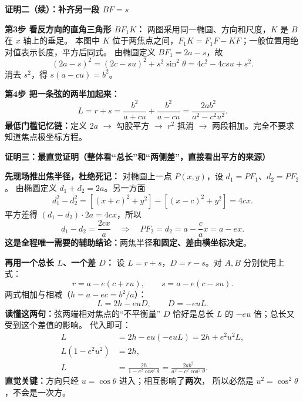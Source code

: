 \clearpage
\begin{proofbox}
\textbf{\textcolor{CProof}{证明二（续）：补齐另一段 $BF=s$}}

\begin{center}\end{center}

\textbf{第3步 看反方向的直角三角形 $BF_1K$：}
两图采用同一椭圆、方向和尺度，$K$ 是 $B$ 在 $x$ 轴上的垂足。
本图中 $K$ 位于两焦点之间，$F_1K=F_1F-KF$；一般位置用绝对值表示长度，平方后同式。
由椭圆定义 $BF_1=2a-s$，故
\[
 (2a-s)^2=(2c-su)^2+s^2\sin^2\theta
 =4c^2-4csu+s^2.
\]
消去 $s^2$，得 $\boxed{s(a-cu)=b^2}$。

\textbf{第4步 把一条弦的两半加起来：}
\[
 L=r+s=\frac{b^2}{a+cu}+\frac{b^2}{a-cu}
 =\boxed{\frac{2ab^2}{a^2-c^2u^2}}.
\]
\textbf{最低门槛记忆链：}定义 $2a$ $\to$ 勾股平方 $\to$ $r^2$ 抵消
$\to$ 两段相加。完全不要求知道焦点极坐标方程。

\medskip
\end{proofbox}
\clearpage
\begin{proofbox}
\textbf{\textcolor{CProof}{证明三：最直觉证明（整体看“总长”和“两侧差”，直接看出平方的来源）}}

\textbf{先现场推出焦半径，杜绝死记：}
对椭圆上一点 $P(x,y)$，设 $d_1=PF_1$、$d_2=PF_2$。
由椭圆定义 $d_1+d_2=2a$。另一方面
\[
 d_1^2-d_2^2
 =[(x+c)^2+y^2]-[(x-c)^2+y^2]=4cx.
\]
平方差得 $(d_1-d_2)\cdot2a=4cx$，所以
\[
 d_1-d_2=\frac{2cx}{a}
 \quad\Longrightarrow\quad
 \boxed{PF_2=d_2=a-\frac ca x=a-ex}.
\]
\textbf{这是全程唯一需要的辅助结论：}两焦半径\textbf{和固定、差由横坐标决定}。

\textbf{再用一个总长 $L$、一个差 $D$：}
设 $L=r+s$，$D=r-s$。对 $A,B$ 分别使用上式：
\[
 r=a-e(c+ru),\qquad s=a-e(c-su).
\]
两式相加与相减（$h=a-ec=b^2/a$）：
\[
 \boxed{L=2h-euD},\qquad
 \boxed{D=-euL}.
\]
\textbf{读懂这两句：}弦两端相对焦点的``不平衡量'' $D$
恰好是总长 $L$ 的 $-eu$ 倍；总长又受到这个差值的影响。
代入即可：
\[
\begin{aligned}
 L&=2h-eu(-euL)=2h+e^2u^2L,\\
 L(1-e^2u^2)&=2h,\\
 \boxed{L}&=\boxed{\frac{2h}{1-e^2\cos^2\theta}
 =\frac{2ab^2}{a^2-c^2\cos^2\theta}}.
\end{aligned}
\]
\textbf{直觉关键：}方向只经 $u=\cos\theta$ 进入；相互影响了\textbf{两次}，
所以必然是 $u^2=\cos^2\theta$，不会是一次方。

\medskip
\end{proofbox}
\clearpage
